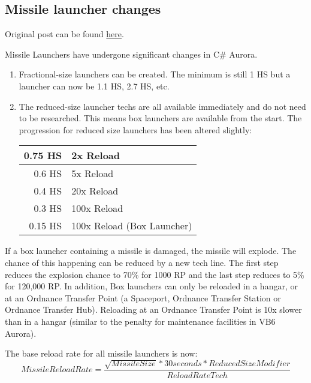 \documentclass[../Aurora C# unofficial manual.tex]{subfiles}
\begin{document}
	
	\subsection{Missile launcher changes}\label{missile_launcher_changes}
	Original post can be found
	\href{http://aurora2.pentarch.org/index.php?topic=8495.msg102815#msg102815}{here}.
	\newline\newline
	
	Missile Launchers have undergone significant changes in C\# Aurora.
	\begin{enumerate}
		\item Fractional-size launchers can be created. The minimum is still 1 HS but a launcher can now be 1.1 HS, 2.7 HS, etc.
		\item The reduced-size launcher techs are all available immediately and do not need to be researched. This means box launchers are available from the start. The progression for reduced size launchers has been altered slightly:
		
		\begin{center}
			\begin{tabular}{|r|l|}
				\hline
				0.75 HS & 2x Reload \\
				\hline
				0.6 HS & 5x Reload \\
				\hline
				0.4 HS & 20x Reload \\
				\hline
				0.3 HS & 100x Reload \\
				\hline
				0.15 HS & 100x Reload (Box Launcher)\footnotemark \\
				\hline
			\end{tabular}
		\end{center}
	\end{enumerate}

	If a box launcher containing a missile is damaged, the missile will explode. The chance of this happening can be reduced by a new tech line. The first step reduces the explosion chance to 70\% for 1000 RP and the last step reduces to 5\% for 120,000 RP. In addition, Box launchers can only be reloaded in a hangar, or at an Ordnance Transfer Point (a Spaceport, Ordnance Transfer Station or Ordnance Transfer Hub). Reloading at an Ordnance Transfer Point is 10x slower than in a hangar (similar to the penalty for maintenance facilities in VB6 Aurora).
	
	The base reload rate for all missile launchers is now:
	\[ Missile Reload Rate = \frac{\sqrt{Missile Size} * 30 seconds * Reduced Size Modifier}{Reload Rate Tech} \]
	
\end{document}
